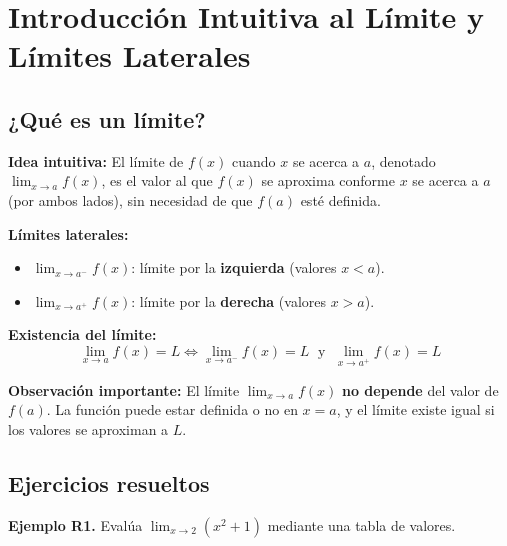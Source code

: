 \documentclass[12pt, a4paper]{article}
\begin{document}
\vspace{8pt}
\newpage
\section{Introducción Intuitiva al Límite y Límites Laterales}

\subsection{¿Qué es un límite?}

\begin{cuadroteoria}
  \textbf{Idea intuitiva:} El límite de $f(x)$ cuando $x$ se acerca a $a$, denotado $\lim_{x \to a} f(x)$, es el valor al que $f(x)$ se aproxima conforme $x$ se acerca a $a$ (por ambos lados), sin necesidad de que $f(a)$ esté definida.

  \textbf{Límites laterales:}
  \begin{itemize}[leftmargin=*]
    \item $\lim_{x \to a^-} f(x)$: límite por la \textbf{izquierda} (valores $x < a$).
    \item $\lim_{x \to a^+} f(x)$: límite por la \textbf{derecha} (valores $x > a$).
  \end{itemize}

  \textbf{Existencia del límite:}
  $$\boxed{\lim_{x \to a} f(x) = L \iff \lim_{x \to a^-} f(x) = L \;\text{ y }\; \lim_{x \to a^+} f(x) = L}$$
\end{cuadroteoria}

\begin{cuadrosolucion}
  \textbf{Observación importante:} El límite $\lim_{x \to a} f(x)$ \textbf{no depende} del valor de $f(a)$. La función puede estar definida o no en $x = a$, y el límite existe igual si los valores se aproximan a $L$.
\end{cuadrosolucion}

\subsection{Ejercicios resueltos}

\textbf{Ejemplo R1.} Evalúa $\lim_{x \to 2} (x^2 + 1)$ mediante una tabla de valores.
\end{document}
